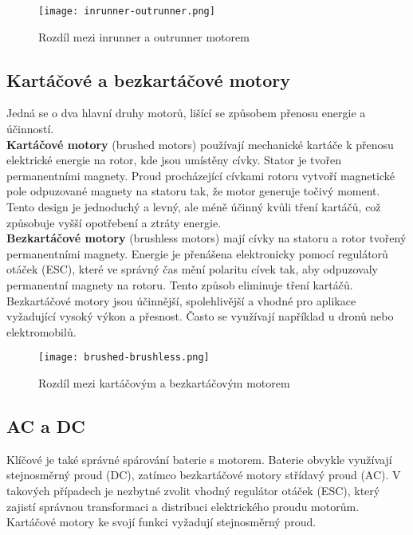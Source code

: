\documentclass[12pt]{report}
\begin{document}
\begin{figure}[H]
	\centering
	\texttt{[image: inrunner-outrunner.png]}
	\caption{Rozdíl mezi inrunner a outrunner motorem \cite{rozum}}
	\label{fig:inrunner-outrunner.png}
  \end{figure}

\subsection[Kartáčové a bezkartáčové motory]{Kartáčové a bezkartáčové motory}
Jedná se o dva hlavní druhy motorů, lišící se způsobem přenosu energie a účinností.\\
\textbf{Kartáčové motory} (brushed motors) používají mechanické kartáče k přenosu elektrické energie na rotor, kde jsou umístěny cívky. Stator je tvořen permanentními magnety. Proud procházející cívkami rotoru vytvoří magnetické pole odpuzované magnety na statoru tak, že motor generuje točivý moment. Tento design je jednoduchý a levný, ale méně účinný kvůli tření kartáčů, což způsobuje vyšší opotřebení a ztráty energie.\\
\textbf{Bezkartáčové motory} (brushless motors) mají cívky na statoru a rotor tvořený permanentními magnety. Energie je přenášena elektronicky pomocí regulátorů otáček (ESC), které ve správný čas mění polaritu cívek tak, aby odpuzovaly permanentní magnety na rotoru. Tento způsob eliminuje tření kartáčů. Bezkartáčové motory jsou účinnější, spolehlivější a vhodné pro aplikace vyžadující vysoký výkon a přesnost. Často se využívají například u dronů nebo elektromobilů.


\begin{figure}[H]
	\centering
	\texttt{[image: brushed-brushless.png]}
	\caption{Rozdíl mezi kartáčovým a bezkartáčovým motorem \cite{rozum}}
	\label{fig:brushed-brushless.png}
  \end{figure}

\subsection[AC a DC]{AC a DC}
Klíčové je také správné spárování baterie s motorem. Baterie obvykle využívají stejnosměrný proud (DC), zatímco bezkartáčové motory střídavý proud (AC). V takových případech je nezbytné zvolit vhodný regulátor otáček (ESC), který zajistí správnou transformaci a distribuci elektrického proudu motorům. Kartáčové motory ke svojí funkci vyžadují stejnosměrný proud. \cite{mainbook} \cite{dojo} \cite{ultimateguide} \cite{motors}
\end{document}
